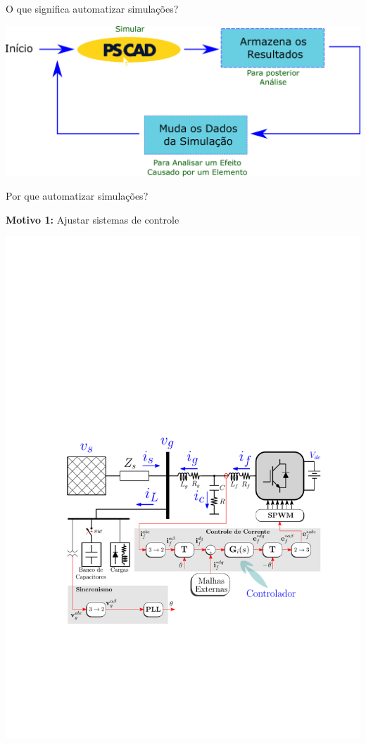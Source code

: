 




\begin{frame}{O que significa automatizar simulações?}
\centering


\includegraphics[width=0.80\linewidth]{./figuras/Automacao/automa}


\end{frame}





\begin{frame}{Por que automatizar simulações?}
\centering

\textbf{Motivo 1:} Ajustar sistemas de controle
\vspace*{0.5cm}

\includegraphics[width=0.55\linewidth]{./figuras/Automacao/SISTEMA}

\end{frame}







